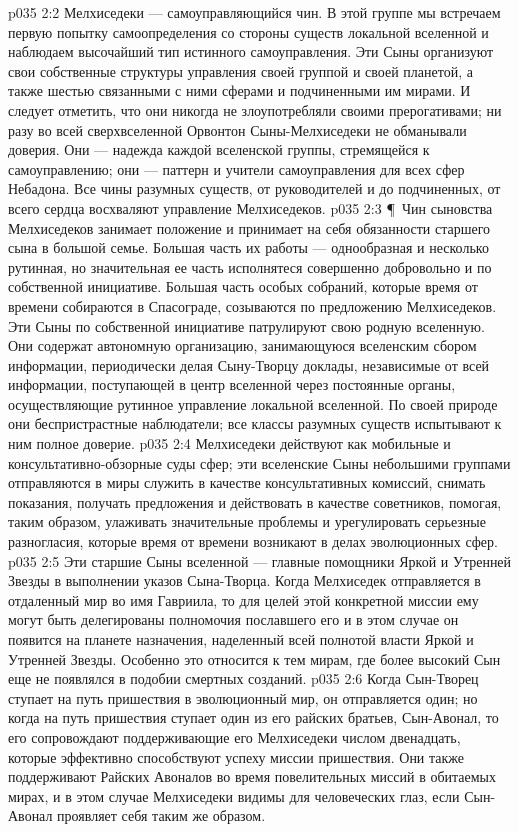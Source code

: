 \vs p035 2:2 Мелхиседеки --- самоуправляющийся чин. В этой группе мы встречаем первую попытку самоопределения со стороны существ локальной вселенной и наблюдаем высочайший тип истинного самоуправления. Эти Сыны организуют свои собственные структуры управления своей группой и своей планетой, а также шестью связанными с ними сферами и подчиненными им мирами. И следует отметить, что они никогда не злоупотребляли своими прерогативами; ни разу во всей сверхвселенной Орвонтон Сыны\hyp{}Мелхиседеки не обманывали доверия. Они --- надежда каждой вселенской группы, стремящейся к самоуправлению; они --- паттерн и учители самоуправления для всех сфер Небадона. Все чины разумных существ, от руководителей и до подчиненных, от всего сердца восхваляют управление Мелхиседеков.
\vs p035 2:3 \P\ Чин сыновства Мелхиседеков занимает положение и принимает на себя обязанности старшего сына в большой семье. Большая часть их работы --- однообразная и несколько рутинная, но значительная ее часть исполнятеся совершенно добровольно и по собственной инициативе. Большая часть особых собраний, которые время от времени собираются в Спасограде, созываются по предложению Мелхиседеков. Эти Сыны по собственной инициативе патрулируют свою родную вселенную. Они содержат автономную организацию, занимающуюся вселенским сбором информации, периодически делая Сыну\hyp{}Творцу доклады, независимые от всей информации, поступающей в центр вселенной через постоянные органы, осуществляющие рутинное управление локальной вселенной. По своей природе они беспристрастные наблюдатели; все классы разумных существ испытывают к ним полное доверие.
\vs p035 2:4 Мелхиседеки действуют как мобильные и консультативно\hyp{}обзорные суды сфер; эти вселенские Сыны небольшими группами отправляются в миры служить в качестве консультативных комиссий, снимать показания, получать предложения и действовать в качестве советников, помогая, таким образом, улаживать значительные проблемы и урегулировать серьезные разногласия, которые время от времени возникают в делах эволюционных сфер.
\vs p035 2:5 Эти старшие Сыны вселенной --- главные помощники Яркой и Утренней Звезды в выполнении указов Сына\hyp{}Творца. Когда Мелхиседек отправляется в отдаленный мир во имя Гавриила, то для целей этой конкретной миссии ему могут быть делегированы полномочия пославшего его и в этом случае он появится на планете назначения, наделенный всей полнотой власти Яркой и Утренней Звезды. Особенно это относится к тем мирам, где более высокий Сын еще не появлялся в подобии смертных созданий.
\vs p035 2:6 Когда Сын\hyp{}Творец ступает на путь пришествия в эволюционный мир, он отправляется один; но когда на путь пришествия ступает один из его райских братьев, Сын\hyp{}Авонал, то его сопровождают поддерживающие его Мелхиседеки числом двенадцать, которые эффективно способствуют успеху миссии пришествия. Они также поддерживают Райских Авоналов во время повелительных миссий в обитаемых мирах, и в этом случае Мелхиседеки видимы для человеческих глаз, если Сын\hyp{}Авонал проявляет себя таким же образом.
